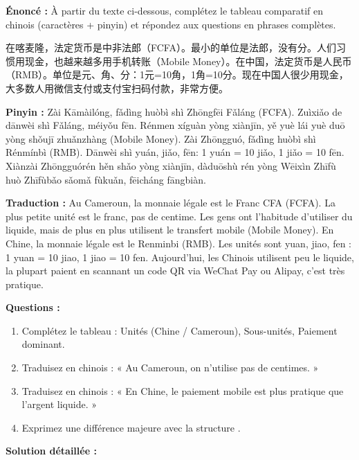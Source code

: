 \documentclass[11pt]{article}
\newcommand{\zh}[1]{\ifmmode\text{#1}\else{#1}\fi}
\begin{document}
\begin{exoresolu}
\textbf{Énoncé :} À partir du texte ci-dessous, complétez le tableau comparatif en chinois (caractères + pinyin) et répondez aux questions en phrases complètes.

\begin{textebox}
在喀麦隆，法定货币是中非法郎（FCFA）。最小的单位是法郎，没有分。人们习惯用现金，也越来越多用手机转账（Mobile Money）。在中国，法定货币是人民币（RMB）。单位是元、角、分：1元=10角，1角=10分。现在中国人很少用现金，大多数人用微信支付或支付宝扫码付款，非常方便。
\par
\textbf{Pinyin :} Zài Kāmàilóng, fǎdìng huòbì shì Zhōngfēi Fǎláng (FCFA). Zuìxiǎo de dānwèi shì Fǎláng, méiyǒu fēn. Rénmen xíguàn yòng xiànjīn, yě yuè lái yuè duō yòng shǒujī zhuǎnzhàng (Mobile Money). Zài Zhōngguó, fǎdìng huòbì shì Rénmínbì (RMB). Dānwèi shì yuán, jiǎo, fēn: 1 yuán = 10 jiǎo, 1 jiǎo = 10 fēn. Xiànzài Zhōngguórén hěn shǎo yòng xiànjīn, dàduōshù rén yòng Wēixìn Zhīfù huò Zhīfùbǎo sǎomǎ fùkuǎn, fēicháng fāngbiàn.
\par
\textbf{Traduction :} Au Cameroun, la monnaie légale est le Franc CFA (FCFA). La plus petite unité est le franc, pas de centime. Les gens ont l'habitude d'utiliser du liquide, mais de plus en plus utilisent le transfert mobile (Mobile Money). En Chine, la monnaie légale est le Renminbi (RMB). Les unités sont yuan, jiao, fen : 1 yuan = 10 jiao, 1 jiao = 10 fen. Aujourd'hui, les Chinois utilisent peu le liquide, la plupart paient en scannant un code QR via WeChat Pay ou Alipay, c'est très pratique.
\end{textebox}

\textbf{Questions :}
\begin{enumerate}
    \item Complétez le tableau : Unités (Chine / Cameroun), Sous-unités, Paiement dominant.
    \item Traduisez en chinois : « Au Cameroun, on n'utilise pas de centimes. »
    \item Traduisez en chinois : « En Chine, le paiement mobile est plus pratique que l'argent liquide. »
    \item Exprimez une différence majeure avec la structure \zh{……，而……}.
\end{enumerate}

\tcblower
\textbf{Solution détaillée :}


\end{exoresolu}
\end{document}
